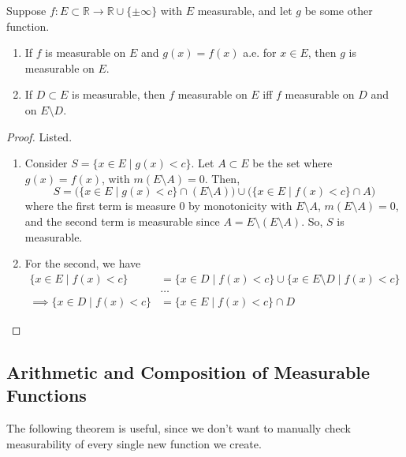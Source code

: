   \begin{theorem}
    Suppose $f: E \subset \mathbb{R} \to \mathbb{R} \cup \{\pm \infty\}$ with $E$ measurable, and let $g$ be some other function. 
    \begin{enumerate}
      \item If $f$ is measurable on $E$ and $g(x) = f(x)$ a.e. for $x \in E$, then $g$ is measurable on $E$. 
      \item If $D \subset E$ is measurable, then $f$ measurable on $E$ iff $f$ measurable on $D$ and on $E \setminus D$. 
    \end{enumerate}
  \end{theorem}
  \begin{proof}
    Listed. 
    \begin{enumerate}
      \item Consider $S = \{x \in E \mid g(x) < c \}$. Let $A \subset E$ be the set where $g(x) = f(x)$, with $m (E \setminus A) = 0$. Then, 
      \begin{equation}
        S = \big( \{x \in E \mid g(x) < c\} \cap (E \setminus A) \big) \cup \big( \{x \in E \mid f(x) < c\} \cap A \big) 
      \end{equation}
      where the first term is measure $0$ by monotonicity with $E \setminus A$, $m(E \setminus A) = 0$, and the second term is measurable since $A = E \setminus (E \setminus A)$. So, $S$ is measurable. 

      \item For the second, we have 
      \begin{align}
        \{ x \in E \mid f(x) < c \} & = \{x \in D \mid f(x) < c\} \cup \{ x \in E \setminus D \mid f(x) < c \} \\ 
                                    & \ldots \\  
        \implies \{x \in D \mid f(x) < c\} & = \{x \in E \mid f(x) < c \} \cap D
      \end{align}

    \end{enumerate}
  \end{proof}

\subsection{Arithmetic and Composition of Measurable Functions}

  The following theorem is useful, since we don't want to manually check measurability of every single new function we create. 

